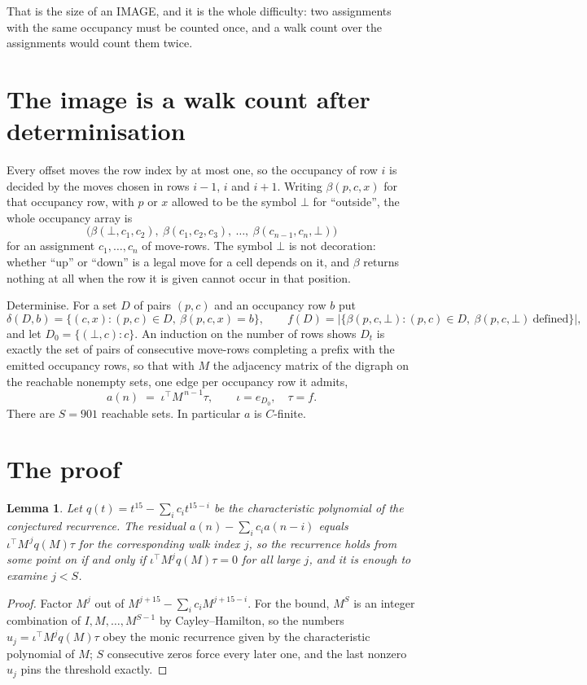 \documentclass[11pt,a4paper]{article}
\theoremstyle{plain}
\newtheorem{lemma}[theorem]{Lemma}
\theoremstyle{definition}
\begin{document}
That is the size of an IMAGE, and it is the whole difficulty: two assignments with the same
occupancy must be counted once, and a walk count over the assignments would count them twice.

\section{The image is a walk count after determinisation}

Every offset moves the row index by at most one, so the occupancy of row $i$ is decided by the
moves chosen in rows $i-1$, $i$ and $i+1$. Writing $\beta(p,c,x)$ for that occupancy row, with
$p$ or $x$ allowed to be the symbol $\bot$ for ``outside'', the whole occupancy array is
\[
\bigl(\beta(\bot,c_1,c_2),\ \beta(c_1,c_2,c_3),\ \dots,\ \beta(c_{n-1},c_n,\bot)\bigr)
\]
for an assignment $c_1,\dots,c_n$ of move-rows. The symbol $\bot$ is not decoration: whether
``up'' or ``down'' is a legal move for a cell depends on it, and $\beta$ returns nothing at all
when the row it is given cannot occur in that position.

Determinise. For a set $D$ of pairs $(p,c)$ and an occupancy row $b$ put
\[
\delta(D,b)=\{(c,x):(p,c)\in D,\ \beta(p,c,x)=b\},\qquad
f(D)=\bigl|\{\beta(p,c,\bot):(p,c)\in D,\ \beta(p,c,\bot)\ \text{defined}\}\bigr| ,
\]
and let $D_0=\{(\bot,c):c\}$. An induction on the number of rows shows $D_t$ is exactly the
set of pairs of consecutive move-rows completing a prefix with the emitted occupancy rows, so
that with $M$ the adjacency matrix of the digraph on the reachable nonempty sets, one edge per
occupancy row it admits,
\[
a(n)\;=\;\iota^{\!\top}M^{\,n-1}\tau,\qquad \iota=e_{D_0},\quad \tau=f .
\]
There are $S=901$ reachable sets. In particular $a$ is $C$-finite.

\section{The proof}

\begin{lemma}\label{lem:crit}
Let $q(t)=t^{15}-\sum_i c_it^{15-i}$ be the characteristic polynomial of the
conjectured recurrence. The residual $a(n)-\sum_ic_ia(n-i)$ equals
$\iota^{\!\top}M^{\,j}q(M)\tau$ for the corresponding walk index $j$, so the recurrence
holds from some point on if and only if $\iota^{\!\top}M^{j}q(M)\tau=0$ for all large $j$,
and it is enough to examine $j<S$.
\end{lemma}

\begin{proof}
Factor $M^{j}$ out of $M^{j+15}-\sum_ic_iM^{j+15-i}$. For the bound, $M^{S}$
is an integer combination of $I,M,\dots,M^{S-1}$ by Cayley--Hamilton, so the numbers
$u_j=\iota^{\!\top}M^{j}q(M)\tau$ obey the monic recurrence given by the characteristic
polynomial of $M$; $S$ consecutive zeros force every later one, and the last nonzero $u_j$
pins the threshold exactly.
\end{proof}
\end{document}
